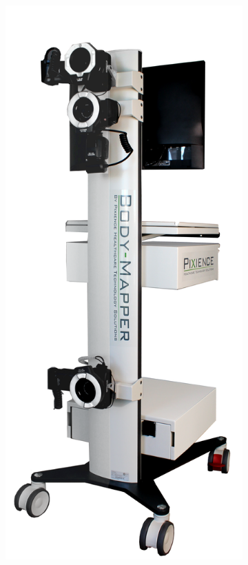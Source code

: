 \begin{figure}[H]
\centering
    \begin{subfigure}{.28\textwidth}
      \centering
      \includegraphics[width=\linewidth]{contents/chapter_2/resources/example_device_bodymapper_1.png}

\end{subfigure}
\end{figure}
